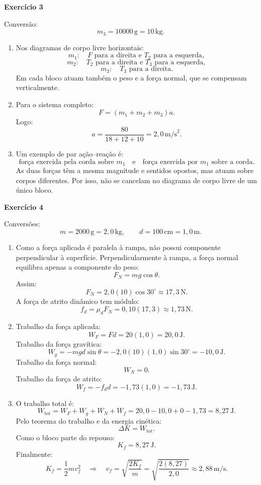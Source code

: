 \documentclass[12pt]{article}
\begin{document}
\newpage

\textbf{Exercício 3}

Conversão:
\[
m_3=10000\,\text{g}=10\,\text{kg}.
\]

\begin{enumerate}[label=\textbf{\alph*)}]
    \item Nos diagramas de corpo livre horizontais:
    \[
    m_1:\quad F \text{ para a direita e } T_2 \text{ para a esquerda},
    \]
    \[
    m_2:\quad T_2 \text{ para a direita e } T_3 \text{ para a esquerda},
    \]
    \[
    m_3:\quad T_3 \text{ para a direita}.
    \]
    Em cada bloco atuam também o peso e a força normal, que se compensam verticalmente.

    \item Para o sistema completo:
    \[
    F=(m_1+m_2+m_3)a.
    \]
    Logo:
    \[
    a=\frac{80}{18+12+10}
    =2,0\,\text{m/s}^2.
    \]

    \item Um exemplo de par ação--reação é:
    \[
    \text{força exercida pela corda sobre }m_1
    \quad\text{e}\quad
    \text{força exercida por }m_1\text{ sobre a corda}.
    \]
    As duas forças têm a mesma magnitude e sentidos opostos, mas atuam sobre corpos
    diferentes. Por isso, não se cancelam no diagrama de corpo livre de um único bloco.
\end{enumerate}

\vspace{0.2cm}

\textbf{Exercício 4}

Conversões:
\[
m=2000\,\text{g}=2,0\,\text{kg},
\qquad
d=100\,\text{cm}=1,0\,\text{m}.
\]

\begin{enumerate}[label=\textbf{\alph*)}]
	\item Como a força aplicada é paralela à rampa, não possui componente perpendicular
	à superfície. Perpendicularmente à rampa, a força normal equilibra apenas a componente
	do peso:
	\[
	F_N=mg\cos\theta.
	\]
	Assim:
	\[
	F_N=2,0(10)\cos 30^\circ
	\approx 17,3\,\text{N}.
	\]
	A força de atrito dinâmico tem módulo:
	\[
	f_d=\mu_dF_N=0,10(17,3)\approx1,73\,\text{N}.
	\]
	
	\item Trabalho da força aplicada:
	\[
	W_F=Fd
	=20(1,0)
	=20,0\,\text{J}.
	\]
	Trabalho da força gravítica:
	\[
	W_g=-mgd\sin\theta
	=-2,0(10)(1,0)\sin30^\circ
	=-10,0\,\text{J}.
	\]
	Trabalho da força normal:
	\[
	W_N=0.
	\]
	Trabalho da força de atrito:
	\[
	W_f=-f_dd
	=-1,73(1,0)
	=-1,73\,\text{J}.
	\]
	
	\item O trabalho total é:
	\[
	W_{\text{tot}}
	=W_F+W_g+W_N+W_f
	=20,0-10,0+0-1,73
	=8,27\,\text{J}.
	\]
	Pelo teorema do trabalho e da energia cinética:
	\[
	\Delta K=W_{\text{tot}}.
	\]
	Como o bloco parte do repouso:
	\[
	K_f=8,27\,\text{J}.
	\]
	Finalmente:
	\[
	K_f=\frac12mv_f^2
	\quad\Longrightarrow\quad
	v_f=\sqrt{\frac{2K_f}{m}}
	=\sqrt{\frac{2(8,27)}{2,0}}
	\approx2,88\,\text{m/s}.
	\]
\end{enumerate}
\end{document}
